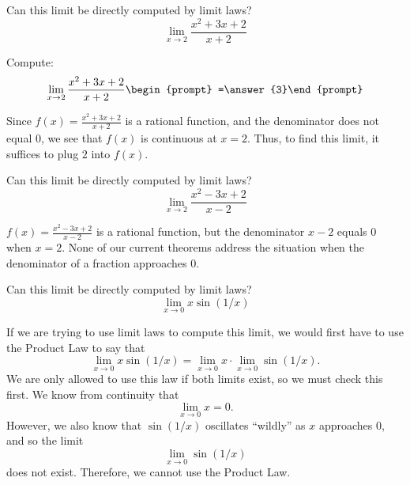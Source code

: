 \documentclass{ximera}
\begin{document}
\begin{question}
  Can this limit be directly computed by limit laws?
  \[
  \displaystyle\lim_{x\to 2}\frac{x^2+3x+2}{x+2} 
  \]
  \begin{multipleChoice}
  \end{multipleChoice}
  \begin{question}
    Compute:
    \[
    \displaystyle\lim_{x\to 2}\frac{x^2+3x+2}{x+2}\begin{prompt} =\answer{3}\end{prompt}
    \]
    \begin{feedback}
      Since $f(x)=\frac{x^2+3x+2}{x+2}$ is a rational function, and
      the denominator does not equal $0$, we see that $f(x)$ is
      continuous at $x=2$.  Thus, to find this limit, it suffices to
      plug $2$ into $f(x)$.
    \end{feedback}
  \end{question}
\end{question}


\begin{question}
  Can this limit be directly computed by limit laws?
  \[
  \displaystyle\lim_{x\to 2}\frac{x^2-3x+2}{x-2}
  \]
  \begin{multipleChoice}
  \end{multipleChoice}
  \begin{feedback}
    $f(x) = \frac{x^2-3x+2}{x-2}$ is a rational function, but the
    denominator $x-2$ equals $0$ when $x=2$. None of our current
    theorems address the situation when the denominator of a fraction
    approaches $0$.
  \end{feedback}
\end{question}


\begin{question}
  Can this limit be directly computed by limit laws?
  \[
  \displaystyle\lim_{x\to 0} x\sin(1/x)
  \]
  \begin{multipleChoice}
  \end{multipleChoice}
  \begin{feedback}
    If we are trying to use limit laws to compute this limit, we would
    first have to use the Product Law to say that
    \[
    \displaystyle\lim_{x\to 0}x\sin(1/x)= \lim_{x\to 0} x \cdot \lim_{x\to 0} \sin(1/x).
    \]
    We are only allowed to use this law if both limits exist, so we
    must check this first.  We know from continuity that
    \[
    \displaystyle\lim_{x\to  0}x=0.
    \]
    However, we also know that $\sin(1/x)$ oscillates ``wildly'' as
    $x$ approaches $0$, and so the limit
    \[
    \lim_{x\to 0} \sin(1/x)
    \]does not exist.  Therefore, we cannot use the
    Product Law.
  \end{feedback}
\end{question}
\end{document}
